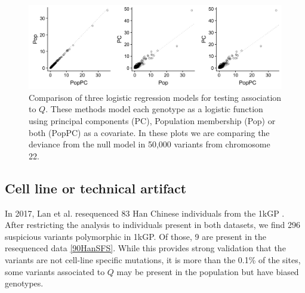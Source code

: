 \documentclass[9pt,lineno]{elife}
\begin{document}
\begin{figure}[h]
\centering
\includegraphics[width=15cm,keepaspectratio]{./Figures/dev_Pop_PC_PopPC.jpg}
\caption{Comparison of three logistic regression models for testing association to $Q$.
These methods model each genotype as a logistic function using principal components (PC), Population membership (Pop) or both (PopPC) as a covariate.
In these plots we are comparing the deviance from the null model in 50,000 variants from chromosome 22.}  
\label{CompareModel}
\end{figure}

\subsection{Cell line or technical artifact}
%

In 2017, Lan et al. resequenced 83 Han Chinese individuals from the 1kGP \citep{Lan2017}.
After restricting the analysis to individuals present in both datasets, we find 296 suspicious variants polymorphic in 1kGP. Of those, 9 are present in the resequenced data \ref{90HanSFS}.
While this provides strong validation that the variants are not cell-line specific mutations, it is more than the 0.1\% of the sites, some variants associated to $Q$ may be present in the population but have biased genotypes.
\end{document}
